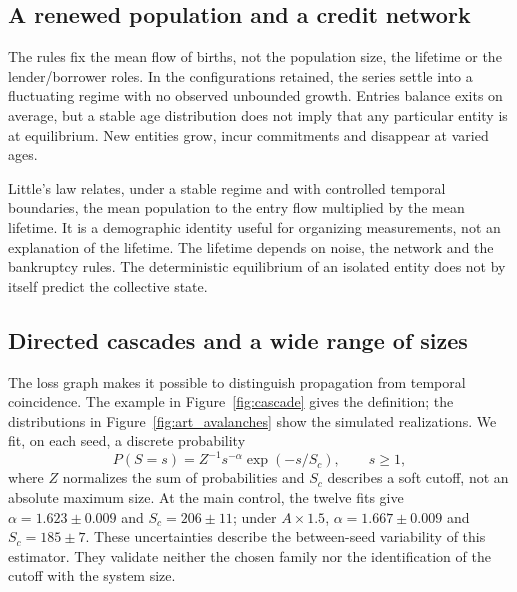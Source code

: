 \subsection{A renewed population and a credit network}
The rules fix the mean flow of births, not the population size, the
lifetime or the lender/borrower roles. In the configurations retained,
the series settle into a fluctuating regime with no observed unbounded
growth. Entries balance exits on average, but a stable age distribution
does not imply that any particular entity is at equilibrium. New
entities grow, incur commitments and disappear at varied ages.

Little's law relates, under a stable regime and with controlled
temporal boundaries, the mean population to the entry flow multiplied
by the mean lifetime. It is a demographic identity useful for
organizing measurements, not an explanation of the lifetime. The
lifetime depends on noise, the network and the bankruptcy rules. The
deterministic equilibrium of an isolated entity does not by itself
predict the collective state.

\subsection{Directed cascades and a wide range of sizes}
The loss graph makes it possible to distinguish propagation from
temporal coincidence. The example in Figure~\ref{fig:cascade} gives the
definition; the distributions in Figure~\ref{fig:art_avalanches} show
the simulated realizations. We fit, on each seed, a discrete
probability
\begin{equation}
 P(S=s)=Z^{-1}s^{-\alpha}\exp(-s/S_c),\qquad s\ge1,
 \label{eq:avalanche}
\end{equation}
where $Z$ normalizes the sum of probabilities and $S_c$ describes a
soft cutoff, not an absolute maximum size. At the main control, the
twelve fits give $\alpha=1.623\pm0.009$ and $S_c=206\pm11$; under
$A\times1.5$, $\alpha=1.667\pm0.009$ and $S_c=185\pm7$. These
uncertainties describe the between-seed variability of this estimator.
They validate neither the chosen family nor the identification of the
cutoff with the system size.


